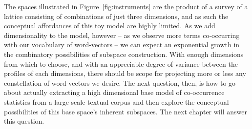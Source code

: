 The spaces illustrated in Figure~\ref{fig:instruments} are the product of a survey of a lattice consisting of combinations of just three dimensions, and as such the conceptual affordances of this toy model are highly limited.  As we add dimensionality to the model, however -- as we observe more terms co-occurring with our vocabulary of word-vectors -- we can expect an exponential growth in the combinatory possibilities of subspace construction.  With enough dimensions from which to choose, and with an appreciable degree of variance between the profiles of each dimensions, there should be scope for projecting more or less any constellation of word-vectors we desire.  The next question, then, is how to go about actually extracting a high dimensional base model of co-occurrence statistics from a large scale textual corpus and then explore the conceptual possibilities of this base space's inherent subspaces.  The next chapter will answer this question.




